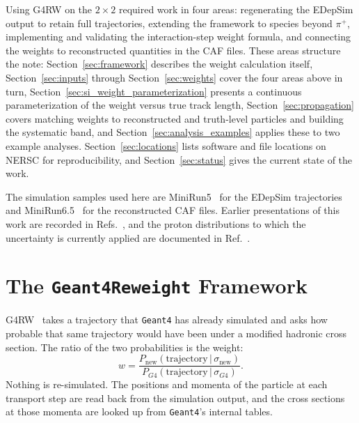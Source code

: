 \documentclass[%
article,
nofootinbib
]{revtex4-2}
\DeclareRobustCommand{\gfour}{\texttt{Geant4}}
\begin{document}
Using G4RW on the $2\times2$ required work in four areas: regenerating the
EDepSim output to retain full trajectories, extending the framework to
species beyond $\pi^+$, implementing and validating the interaction-step
weight formula, and connecting the weights to reconstructed quantities in
the CAF files. These areas structure the note: Section~\ref{sec:framework}
describes the weight calculation itself, Section~\ref{sec:inputs} through
Section~\ref{sec:weights} cover the four areas above in turn,
Section~\ref{sec:si_weight_parameterization} presents a continuous
parameterization of the weight versus true track length,
Section~\ref{sec:propagation} covers matching weights to reconstructed and
truth-level particles and building the systematic band, and
Section~\ref{sec:analysis_examples} applies these to two example analyses.
Section~\ref{sec:locations} lists software and file locations on NERSC for
reproducibility, and Section~\ref{sec:status} gives the current state of the
work.

The simulation samples used here are MiniRun5~\cite{minirun5} for the
EDepSim trajectories and MiniRun6.5~\cite{minirun6} for the reconstructed
CAF files. Earlier presentations of this work are recorded in
Refs.~\cite{docdb_36481,docdb_36847,docdb_workshop_sep2026}, and the proton
distributions to which the uncertainty is currently applied are documented
in Ref.~\cite{docdb_37081}.
\section{\label{sec:framework}The \texttt{Geant4Reweight} Framework}

G4RW~\cite{g4rw_paper,g4rw_2x2_repo,geant4reweight_repo} takes a trajectory that \gfour{} has
already simulated and asks how probable that same trajectory would have been
under a modified hadronic cross section. The ratio of the two probabilities is
the weight:
\begin{equation}
\label{eq:weight_def}
    w = \frac{P_{\text{new}}(\text{trajectory}\,|\,\sigma_{\text{new}})}
             {P_{G4}(\text{trajectory}\,|\,\sigma_{G4})}.
\end{equation}
Nothing is re-simulated. The positions and momenta of the particle at each
transport step are read back from the simulation output, and the cross sections
at those momenta are looked up from \gfour{}'s internal tables.
\end{document}

